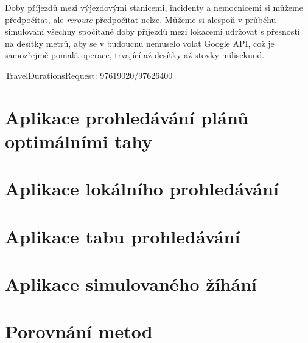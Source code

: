 Doby příjezdů mezi výjezdovými stanicemi, incidenty a nemocnicemi si můžeme předpočítat, ale \textit{reroute} předpočítat nelze.
Můžeme si alespoň v průběhu simulování všechny spočítané doby příjezdů mezi lokacemi udržovat s přesností na desítky metrů,
aby se v budoucnu nemuselo volat Google API, což je samozřejmě pomalá operace, trvající až desítky až stovky milisekund. 

TravelDurationsRequest: 97619020/97626400


\section{Aplikace prohledávání plánů optimálními \linebreak tahy}

\section{Aplikace lokálního prohledávání}

\section{Aplikace tabu prohledávání}

\section{Aplikace simulovaného žíhání}

\section{Porovnání metod}

